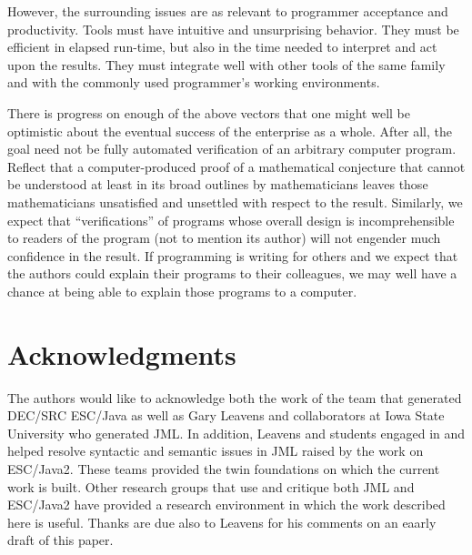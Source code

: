 \documentclass{llncs}
\begin{document}
However, the surrounding issues are as relevant to programmer
acceptance and productivity.  Tools must have intuitive and
unsurprising behavior. They must be efficient in elapsed run-time, but
also in the time needed to interpret and act upon the results.  They
must integrate well with other tools of the same family and with the
commonly used programmer's working environments.


There is progress on enough of the above vectors that one might well
be optimistic about the eventual success of the enterprise as a whole.
After all, the goal need not be fully automated verification of an
arbitrary computer program.  Reflect that a computer-produced proof of
a mathematical conjecture that cannot be understood at least in its
broad outlines by mathematicians leaves those mathematicians
unsatisfied and unsettled with respect to the result.  Similarly, we
expect that ``verifications'' of programs whose overall design is
incomprehensible to readers of the program (not to mention its author)
will not engender much confidence in the result.  If programming is
writing for others and we expect that the authors could explain their
programs to their colleagues, we may well have a chance at being able
to explain those programs to a computer.


\section{Acknowledgments}
The authors would like to acknowledge both the work of the team that
generated DEC/SRC ESC/Java as well as Gary Leavens and collaborators
at Iowa State University who generated JML.  In addition, Leavens and
students engaged in and helped resolve syntactic and semantic issues
in JML raised by the work on ESC/Java2.  These teams provided the twin
foundations on which the current work is built.  Other research groups
that use and critique both JML and ESC/Java2 have provided a research
environment in which the work described here is useful.  Thanks are
due also to Leavens for his comments on an eaarly draft of this paper.
\end{document}
